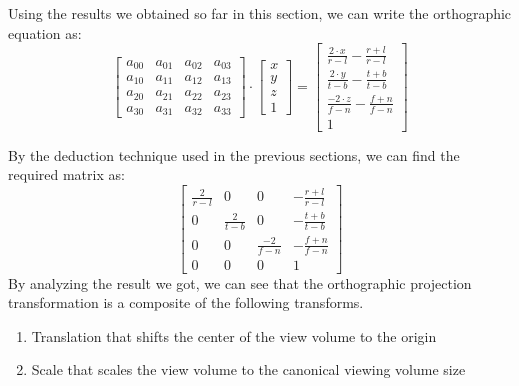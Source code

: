 Using the results we obtained so far in this section, we can write the orthographic equation as:
\[
\begin{bmatrix}
a_{00} & a_{01} & a_{02} & a_{03} \\
a_{10} & a_{11} & a_{12} & a_{13} \\
a_{20} & a_{21} & a_{22} & a_{23} \\
a_{30} & a_{31} & a_{32} & a_{33}
\end{bmatrix}
\cdot
\begin{bmatrix}
x \\
y \\
z \\
1
\end{bmatrix}
=
\begin{bmatrix}
\frac{2 \cdot x}{r-l} - \frac{r+l}{r-l}\\
\frac{2 \cdot y}{t-b} - \frac{t+b}{t-b}\\
\frac{-2 \cdot z}{f-n} - \frac{f+n}{f-n}\\
1
\end{bmatrix}
\]

By the deduction technique used in the previous sections, we can find the required matrix as:
\begin{equation}
\begin{bmatrix}
\frac{2}{r-l} & 0 & 0 &-\frac{r+l}{r-l} \\
0 & \frac{2}{t-b} & 0 &-\frac{t+b}{t-b} \\
0 & 0 & \frac{-2}{f-n} & -\frac{f+n}{f-n} \\
0 & 0 & 0 & 1
\end{bmatrix}
\end{equation}
By analyzing the result we got, we can see that the orthographic projection transformation is a composite of the following transforms.
\vspace{1em}
\begin{enumerate}
    \item Translation that shifts the center of the view volume to the origin
    \item Scale that scales the view volume to the canonical viewing volume size
\end{enumerate}
\vspace{1em} 
